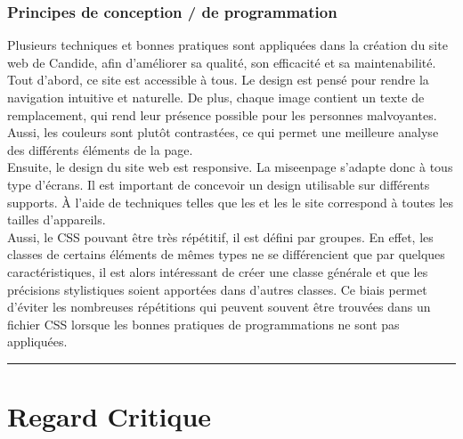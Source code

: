 \documentclass[a4,10pt,french]{sphinxmanual}
\begin{document}
\subsection{Principes de conception / de programmation}
\label{\detokenize{chapitre-02:principes-de-conception-de-programmation}}
\sphinxAtStartPar
Plusieurs techniques et bonnes pratiques sont appliquées dans la création du site web de Candide, afin d’améliorer sa qualité, son efficacité et sa maintenabilité.\\
Tout d’abord, ce site est accessible à tous. Le design est pensé pour rendre la navigation intuitive et naturelle. De plus, chaque image contient un texte de remplacement, qui rend leur présence possible pour les personnes malvoyantes. Aussi, les couleurs sont plutôt contrastées, ce qui permet une meilleure analyse des différents éléments de la page.\\
Ensuite, le design du site web est responsive. La mise\sphinxhyphen{}en\sphinxhyphen{}page s’adapte donc à tous type d’écrans. Il est important de concevoir un design utilisable sur différents supports. À l’aide de techniques telles que les  et les  le site correspond à toutes les tailles d’appareils.\\
Aussi, le CSS pouvant être très répétitif, il est défini par groupes. En effet, les classes de certains éléments de mêmes types ne se différencient que par quelques caractéristiques, il est alors intéressant de créer une classe générale et que les précisions stylistiques soient apportées dans d’autres classes. Ce biais permet d’éviter les nombreuses répétitions qui peuvent souvent être trouvées dans un fichier CSS lorsque les bonnes pratiques de programmations ne sont pas appliquées.


\bigskip\hrule\bigskip



\chapter{Regard Critique}
\label{\detokenize{chapitre-03:regard-critique}}\label{\detokenize{chapitre-03::doc}}
\end{document}
